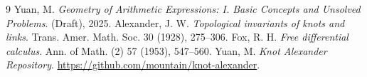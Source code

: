 \documentclass[a4paper,12pt]{article}
\begin{document}
\begin{thebibliography}{9}
 Yuan, M. \textit{Geometry of Arithmetic Expressions: I. Basic Concepts and Unsolved Problems}. (Draft), 2025.
 Alexander, J. W. \textit{Topological invariants of knots and links}. Trans. Amer. Math. Soc. 30 (1928), 275–306.
 Fox, R. H. \textit{Free differential calculus}. Ann. of Math. (2) 57 (1953), 547–560.
 Yuan, M. \textit{Knot Alexander Repository}. \url{https://github.com/mountain/knot-alexander}.
\end{thebibliography}
\end{document}
